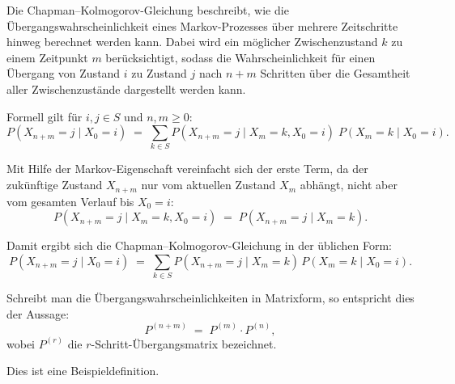 Die Chapman--Kolmogorov-Gleichung beschreibt, wie die Übergangswahrscheinlichkeit eines Markov-Prozesses über mehrere Zeitschritte hinweg berechnet werden kann. 
Dabei wird ein möglicher Zwischenzustand $k$ zu einem Zeitpunkt $m$ berücksichtigt, sodass die Wahrscheinlichkeit für einen Übergang von Zustand $i$ zu Zustand $j$ nach $n+m$ Schritten über die Gesamtheit aller Zwischenzustände dargestellt werden kann.

Formell gilt für $i, j \in S$ und $n, m \geq 0$:
\begin{equation}
P(X_{n+m} = j \mid X_0 = i) \;=\; \sum_{k \in S} P(X_{n+m} = j \mid X_m = k, X_0 = i)\; P(X_m = k \mid X_0 = i).
\end{equation}

Mit Hilfe der Markov-Eigenschaft vereinfacht sich der erste Term, da der zukünftige Zustand $X_{n+m}$ nur vom aktuellen Zustand $X_m$ abhängt, nicht aber vom gesamten Verlauf bis $X_0 = i$:
\begin{equation}
P(X_{n+m} = j \mid X_m = k, X_0 = i) \;=\; P(X_{n+m} = j \mid X_m = k).
\end{equation}

Damit ergibt sich die Chapman--Kolmogorov-Gleichung in der üblichen Form:
\begin{equation}
P(X_{n+m} = j \mid X_0 = i) \;=\; \sum_{k \in S} P(X_{n+m} = j \mid X_m = k)\, P(X_m = k \mid X_0 = i).
\end{equation}

Schreibt man die Übergangswahrscheinlichkeiten in Matrixform, so entspricht dies der Aussage:
\begin{equation}
P^{(n+m)} \;=\; P^{(m)} \cdot P^{(n)},
\end{equation}
wobei $P^{(r)}$ die $r$-Schritt-Übergangsmatrix bezeichnet.


\begin{definition}[Beispieldefinition]
Dies ist eine Beispieldefinition.
\end{definition}
